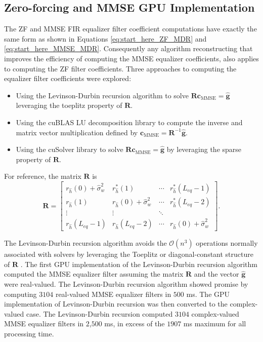 \clearpage
\subsection{Zero-forcing and MMSE GPU Implementation}
The ZF and MMSE FIR equalizer filter coefficient computations have exactly the same form as shown in Equations \eqref{eq:start_here_ZF_MDR} and \eqref{eq:start_here_MMSE_MDR}.
Consequently any algorithm reconstructing that improves the efficiency of computing the MMSE equalizer coefficients, also applies to computing the ZF filter coefficients.
Three approaches to computing the equalizer filter coefficients were explored:
\begin{itemize}
\item Using the Levinson-Durbin recursion algorithm to solve $\mathbf{R} \mathbf{c}_\text{MMSE} = \hat{\mathbf{g}}$ leveraging the toeplitz property of $\mathbf{R}$.
\item Using the cuBLAS LU decomposition library to compute the inverse and matrix vector multiplication defined by $\mathbf{c}_\text{MMSE} = \mathbf{R}^{-1} \hat{\mathbf{g}}$.
\item Using the cuSolver library to solve $\mathbf{R} \mathbf{c}_\text{MMSE} = \hat{\mathbf{g}}$ by leveraging the sparse property of $\mathbf{R}$.
\end{itemize}
For reference, the matrix $\mathbf{R}$ is
\begin{equation}
\mathbf{R} = 
		\begin{bmatrix}
		r_{\hat{h}}(0) + \hat{\sigma}^2_w			& r^\ast_{\hat{h}}(1)	& \cdots 	& r^\ast_{\hat{h}}(L_{eq}-1)  	\\
		r_{\hat{h}}(1) 			& r_{\hat{h}}(0) + \hat{\sigma}^2_w		& \cdots 	& r^\ast_{\hat{h}}(L_{eq}-2)  	\\
		\vdots	 				& \vdots				& \ddots 	&  								\\
		r_{\hat{h}}(L_{eq}-1)	& r_{\hat{h}}(L_{eq}-2)	& \cdots	& r_{\hat{h}}(0) + \hat{\sigma}^2_w  			
	\end{bmatrix}.
	\label{eq:R_h_ref}
\end{equation}

The Levinson-Durbin recursion algorithm avoids the $\mathcal{O}(n^3)$ operations normally associated with solvers by leveraging the Toeplitz or diagonal-constant structure of $\mathbf{R}$ \cite[Chap. 5]{hayes:1996}.
The first GPU implementation of the Levinson-Durbin recursion algorithm computed the MMSE equalizer filter assuming the matrix $\mathbf{R}$ and the vector $\hat{\mathbf{g}}$ were real-valued.
The Levinson-Durbin recursion algorithm showed promise by computing $3104$ real-valued MMSE equalizer filters in $500$ ms.
The GPU implementation of Levinson-Durbin recursion was then converted to the complex-valued case.
The Levinson-Durbin recursion computed $3104$ complex-valued MMSE equalizer filters in $2$,$500$ ms, in excess of the $1907$ ms maximum for all processing time.

